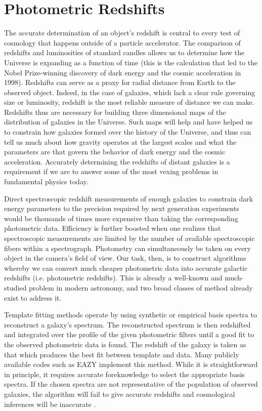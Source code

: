 \documentclass[prd, nofootinbib, floatfix, 12pt,tightenlines]{revtex4}
\begin{document}
\section{Photometric Redshifts}
\label{sec:photoz}

The accurate determination of an object's redshift is central to every test of
cosmology that happens outside of a particle accelerator.  The comparison of
redshifts and luminosities of standard candles allows us to determine how the
Universe is expanding as a function of time 
(this is the calculation that led to the
Nobel Prize-winning discovery of dark energy and the cosmic acceleration
in 1998).  Redshifts can serve as a proxy for
radial distance from Earth to the observed object.  Indeed, in the case of
galaxies, which lack a clear rule governing size or luminosity, redshift is
the most reliable measure of distance we can make.  Redshifts thus are
necessary for building three dimensional maps of the distribution of galaxies
in the Universe.  Such maps will help and have helped us to 
constrain how galaxies formed over the history of the Universe, and thus can
tell us much about how gravity operates at the largest scales and what the
parameters are that govern the behavior of dark energy and the cosmic
acceleration.  Accurately determining the redshifts of distant galaxies is a
requirement if we are to answer some of the most vexing problems in
fundamental physics today.

Direct spectroscopic redshift measurements of enough galaxies
to constrain dark energy parameters to the precision required by next
generation experiments would be thousands of times more expensive than taking
the corresponding photometric data.
Efficiency is further boosted when one realizes that spectroscopic measurements
are limited by the number of available spectroscopic fibers
within a spectrograph.  Photometry can
simultaneously be taken on every object in the camera's field of view.
Our task, then, is to construct algorithms whereby we can convert much cheaper
photometric data into accurate galactic redshifts (i.e. photometric redshifts).
This is already a
well-known and much-studied problem in modern astronomy, and two broad classes
of method already exist to address it.

Template fitting methods operate by using synthetic or empirical basis spectra
to reconstruct a galaxy's spectrum.  The reconstructed spectrum is then
redshifted and integrated over the profile of the given
photometric filters until a good fit to the observed photometric data is
found.  The redshift of the galaxy is taken as that which produces the best fit
between template and data.  Many publicly available codes such as 
EAZY \cite{eazy} implement this method.  
While it is straightforward in principle, it requires
accurate foreknowledge to select the appropriate basis spectra.  If the chosen
spectra are not representative of the population of observed
galaxies, the algorithm will fail to give accurate redshifts and cosmological
inferences will be inaccurate \cite{budavari2008}.
\end{document}
